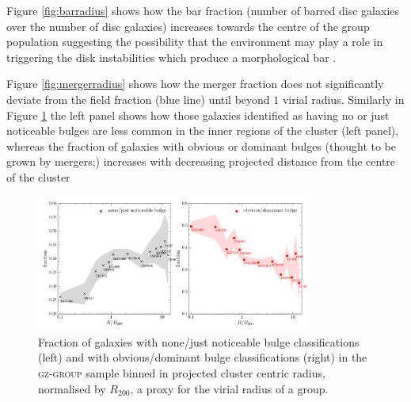 \documentclass[useAMS,usenatbib]{mn2e}
\begin{document}
Figure \ref{fig:barradius} shows how the bar fraction (number of barred disc galaxies over the number of disc galaxies) increases towards the centre of the group population suggesting the possibility that the environment may play a role in triggering the disk instabilities which produce a morphological bar \citep{ref, ref, ref}. 

Figure \ref{fig:mergerradius} shows how the merger fraction does not significantly deviate from the field fraction (blue line) until beyond $1$ virial radius. Similarly in Figure \ref{fig:bulgeradius} the left panel shows how those galaxies identified as having no or just noticeable bulges are less common in the inner regions of the cluster (left panel), whereas the fraction of galaxies with obvious or dominant bulges (thought to be grown by mergers;\citealt{ref, ref, ref}) increases with decreasing projected distance from the centre of the cluster 

\begin{figure}
\includegraphics[width=0.8\textwidth]{min_max_bulge_fraction_trend_with_log_radius.pdf}
\caption{Fraction of galaxies with none/just noticeable bulge classifications (left) and with obvious/dominant bulge classifications (right) in the \textsc{gz-group} sample binned in projected cluster centric radius, normalised by $R_{200}$, a proxy for the virial radius of a group.}
\label{fig:bulgeradius}
\end{figure}
\end{document}
